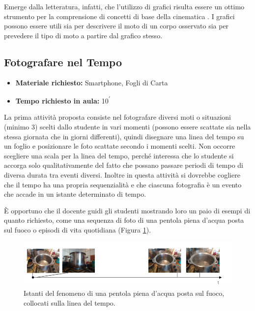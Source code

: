 \documentclass{report} \usepackage[T1]{fontenc} \usepackage[italian]{babel}
\begin{document}
Emerge dalla letteratura, infatti, che l’utilizzo di grafici risulta essere un
ottimo strumento per la comprensione di concetti di base della cinematica
\cite{beichner1994testing}. I grafici possono essere
utili sia per descrivere il moto di un corpo osservato sia per prevedere il tipo
di moto a partire dal grafico stesso.

\subsection{Fotografare nel Tempo}

\begin{itemize}
\item \textbf{Materiale richiesto:} Smartphone, Fogli di Carta
\item \textbf{Tempo richiesto in aula:} 10\textsuperscript{$\prime$}
\end{itemize}

La prima attività proposta consiste nel fotografare diversi moti o situazioni
(minimo 3) scelti dallo studente in vari momenti (possono essere scattate sia
nella stessa giornata che in giorni differenti), quindi disegnare una linea del
tempo su un foglio e posizionare le foto scattate secondo i momenti scelti. Non
occorre scegliere una scala per la linea del tempo, perché interessa che lo
studente si accorga solo qualitativamente del fatto che possano passare periodi
di tempo di diversa durata tra eventi diversi. Inoltre in questa attività si
dovrebbe cogliere che il tempo ha una propria sequenzialità e che ciascuna
fotografia è un evento che accade in un istante determinato di tempo.

\`E opportuno che il docente guidi gli studenti mostrando loro un paio di esempi
di quanto richiesto, come una sequenza di foto di una pentola piena d’acqua
posta sul fuoco o episodi di vita quotidiana (Figura \ref{fig:asse_t_pentola}).

\begin{figure}[H]
\centering
  \includegraphics[width=\textwidth]{asse_t_pentola}
  \caption{Istanti del fenomeno di una pentola piena d'acqua posta sul fuoco,
           collocati sulla linea del tempo.}
  \label{fig:asse_t_pentola}
\end{figure}
\end{document}

